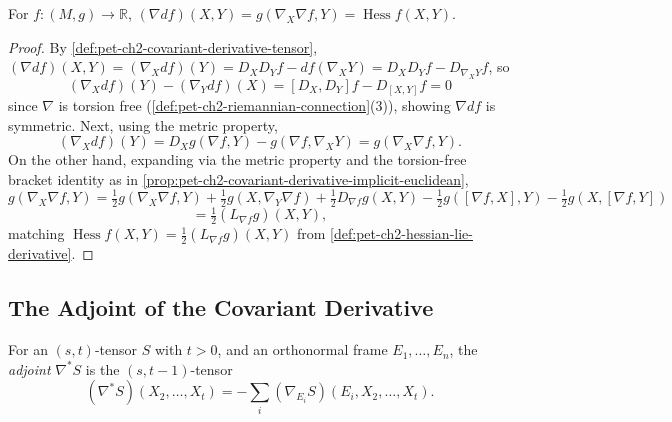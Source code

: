 \begin{proposition}
  \label{prop:pet-ch2-hessian-covariant-derivative}
  \leanok
  For $f:(M,g)\to\mathbb{R}$, $(\nabla df)(X,Y)=g(\nabla_X\nabla f,Y)=\operatorname{Hess}f(X,Y)$.
\end{proposition}
\begin{proof}
  \leanok
  By \cref{def:pet-ch2-covariant-derivative-tensor},
  $(\nabla df)(X,Y)=(\nabla_Xdf)(Y)=D_XD_Yf-df(\nabla_XY)=D_XD_Yf-D_{\nabla_XY}f$,
  so
  \[
    (\nabla_Xdf)(Y)-(\nabla_Ydf)(X)=[D_X,D_Y]f-D_{[X,Y]}f=0
  \]
  since $\nabla$ is torsion free (\cref{def:pet-ch2-riemannian-connection}(3)),
  showing $\nabla df$ is symmetric. Next, using the metric property,
  \[
    (\nabla_Xdf)(Y)=D_Xg(\nabla f,Y)-g(\nabla f,\nabla_XY)=g(\nabla_X\nabla f,Y).
  \]
  On the other hand, expanding via the metric property and the torsion-free
  bracket identity as in \cref{prop:pet-ch2-covariant-derivative-implicit-euclidean},
  \[
    g(\nabla_X\nabla f,Y)
    = \tfrac12g(\nabla_X\nabla f,Y)+\tfrac12g(X,\nabla_Y\nabla f)
    + \tfrac12D_{\nabla f}g(X,Y)-\tfrac12g([\nabla f,X],Y)-\tfrac12g(X,[\nabla f,Y])
  \]
  \[
    = \tfrac12(L_{\nabla f}g)(X,Y),
  \]
  matching $\operatorname{Hess}f(X,Y)=\frac12(L_{\nabla f}g)(X,Y)$ from
  \cref{def:pet-ch2-hessian-lie-derivative}.
\end{proof}

\subsection{The Adjoint of the Covariant Derivative}

\begin{definition}
  \label{def:pet-ch2-covariant-derivative-adjoint}
  \leanok
  For an $(s,t)$-tensor $S$ with $t>0$, and an orthonormal frame
  $E_1,\dots,E_n$, the \emph{adjoint} $\nabla^*S$ is the $(s,t-1)$-tensor
  \[
    (\nabla^*S)(X_2,\dots,X_t)=-\sum_i(\nabla_{E_i}S)(E_i,X_2,\dots,X_t).
  \]
\end{definition}

